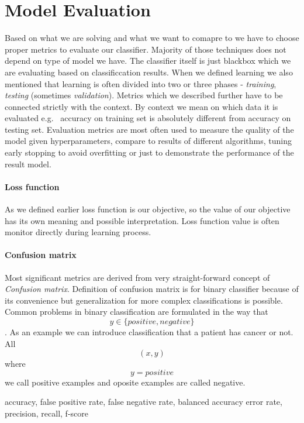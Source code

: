 \section{Model Evaluation}
Based on what we are solving and what we want to comapre to we have to choose proper metrics to evaluate our classifier. Majority of those techniques does not depend on type of model we have. The classifier itself is just blackbox which we are evaluating based on classificcation results.
When we defined learning we also mentioned that learning is often divided into two or three phases - \emph{training}, \emph{testing} (sometimes \emph{validation}). Metrics which we described further have to be connected strictly with the context. By context we mean on which data it is evaluated e.g. \ accuracy on training set is absolutely different from accuracy on testing set. 
Evaluation metrics are most often used to measure the quality of the model given hyperparameters, compare to results of different algorithms, tuning early stopping to avoid overfitting or just to demonstrate the performance of the result model.

\paragraph{Loss function}
As we defined earlier loss function is our objective, so the value of our objective has its own meaning and possible interpretation.  Loss function value is often monitor directly during learning process.

\paragraph{Confusion matrix}
Most significant metrics are derived from very straight-forward concept of \emph{Confusion matrix}. Definition of confusion matrix is for binary classifier because of its convenience but generalization for more complex classifications is possible. Common problems in binary classification are formulated in the way that $$y \in \{positive, negative\}$$. As an example we can introduce classification that a patient has cancer or not. All $$(x,y)$$ where $$y=positive$$ we call positive examples and oposite examples are called negative.

accuracy, false positive rate, false negative rate, balanced accuracy error rate, precision, recall, f-score
\cite{Hossin2015}

